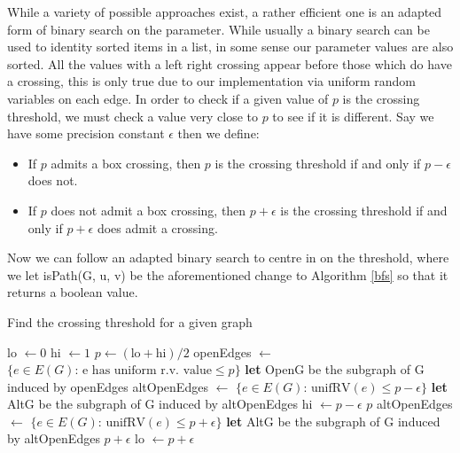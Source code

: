 \documentclass[a4paper,11pt]{article}
\theoremstyle{definition}
\begin{document}
While a variety of possible approaches exist, a rather efficient one is an adapted form of binary search on the parameter. While usually a binary search can be used to identity sorted items in a list, in some sense our parameter values are also sorted. All the values with a left right crossing appear before those which do have a crossing, this is only true due to our implementation via uniform random variables on each edge.
In order to check if a given value of $p$ is the crossing threshold, we must check a value very close to $p$ to see if it is different. Say we have some precision constant $\epsilon$ then we define:
\begin{itemize}
	\item If $p$ admits a box crossing, then $p$ is the crossing threshold if and only if $p-\epsilon$ does not.
	\item If $p$ does not admit a box crossing, then $p+\epsilon$ is the crossing threshold if and only if $p+\epsilon$ does admit a crossing.
\end{itemize}

Now we can follow an adapted binary search to centre in on the threshold, where we let isPath(G, u, v) be the aforementioned change to Algorithm \ref*{bfs} so that it returns a boolean value.

\begin{algorithm}
	\caption{Find the crossing threshold for a given graph}\label{findthreshold}
	\begin{algorithmic}[1]
	 
	\State lo $\gets 0$
	\State hi $\gets 1$
		\State $p \gets (\text{lo}+\text{hi})/2$
		\State openEdges $\gets$ $\{e \in E(G)\text{: e has uniform r.v. value}\leq p\}$
		\State \textbf{let} OpenG be the subgraph of G induced by openEdges
			\State altOpenEdges $\gets$ $\{e \in E(G)\text{: unifRV}(e)\leq p-\epsilon\}$
			\State \textbf{let} AltG be the subgraph of G induced by altOpenEdges
				\State hi $\gets p - \epsilon$
			\Else
				\State \Return $p$
			\EndIf
		\Else
			\State altOpenEdges $\gets$ $\{e \in E(G)\text{: unifRV}(e)\leq p+\epsilon\}$
			\State \textbf{let} AltG be the subgraph of G induced by altOpenEdges
				\State \Return $p +\epsilon$
			\Else
			\State lo $\gets p+\epsilon$
			\EndIf
		\EndIf
	\EndWhile
	\EndProcedure
	\end{algorithmic}
\end{algorithm}
\end{document}
